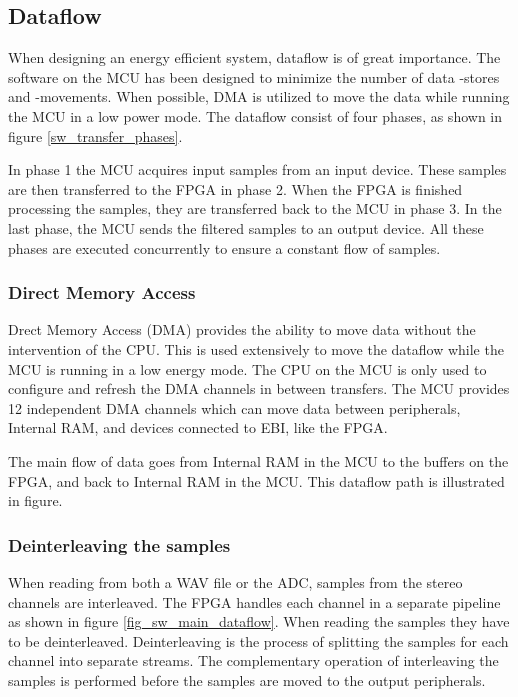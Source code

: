 
\subsection{Dataflow}
When designing an energy efficient system, dataflow is of great importance. The
software on the MCU has been designed to minimize the number of data -stores and
-movements. When possible, DMA is utilized to move the data while running the
MCU in a low power mode. The dataflow consist of four phases, as shown in figure
\ref{sw_transfer_phases}.

In phase 1 the MCU acquires input samples from an input device. These samples
are then transferred to the FPGA in phase 2. When the FPGA is finished
processing the samples, they are transferred back to the MCU in phase 3. In the
last phase, the MCU sends the filtered samples to an output device. All these
phases are executed concurrently to ensure a constant flow of samples.



\subsubsection{Direct Memory Access}
Drect Memory Access (DMA) provides the ability to move data
without the intervention of the CPU. This is used extensively to move the
dataflow while the MCU is running in a low energy mode. The CPU on the MCU is
only used to configure and refresh the DMA channels in between transfers. The
MCU provides 12 independent DMA channels which can move data between
peripherals, Internal RAM, and devices connected to EBI, like the FPGA.

The main flow of data goes from Internal RAM in the MCU to the buffers on
the FPGA, and back to Internal RAM in the MCU. This dataflow path is illustrated in figure.

% 

\subsubsection{Deinterleaving the samples}
When reading from both a WAV file or the ADC, samples from the stereo channels
are interleaved. The FPGA handles each channel in a separate pipeline as shown
in figure \ref{fig_sw_main_dataflow}.
When reading the samples they have to be deinterleaved. Deinterleaving is the
process of splitting the samples for each channel into separate streams.
The complementary operation of interleaving the samples is performed before the samples
are moved to the output peripherals.

